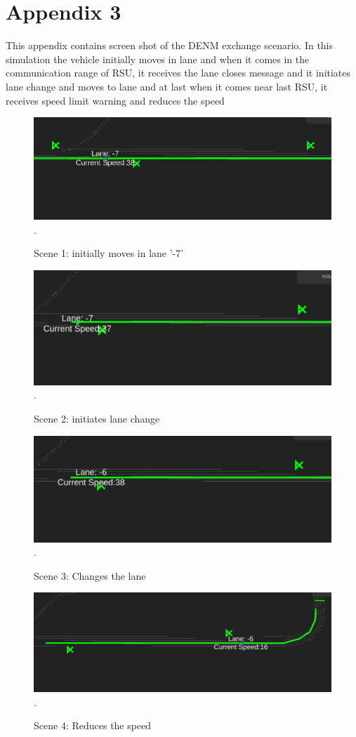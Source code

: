 \chapter*{Appendix 3}
This appendix contains screen shot of the DENM exchange scenario. In this simulation the vehicle initially moves in lane  and when it comes in the communication range of RSU, it receives the lane closes message and it initiates lane change and moves to lane  and at last when it comes near last RSU, it receives speed limit warning and reduces the speed

\begin{figure}[h!]
    \centering
    \includegraphics[width=12cm]{Framework/Images/1.png}.
    \caption{Scene 1: initially moves in lane '-7'}
\end{figure}
\begin{figure}[h!]
    \centering
    \includegraphics[width=12cm]{Framework/Images/2.png}.
    \caption{Scene 2: initiates lane change}
\end{figure}
\begin{figure}[h!]
    \centering
    \includegraphics[width=12cm]{Framework/Images/3.png}.
    \caption{Scene 3: Changes the lane}
\end{figure}
\begin{figure}[h!]
    \centering
    \includegraphics[width=12cm]{Framework/Images/4.png}.
    \caption{Scene 4: Reduces the speed}
\end{figure}